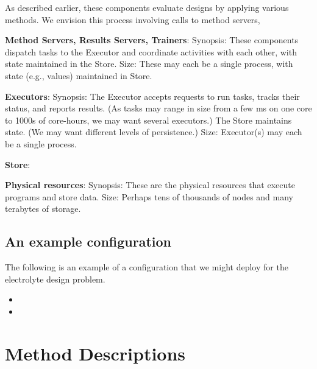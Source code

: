 \documentclass[10pt]{article}
\begin{document}
As described earlier, these components evaluate designs by applying various methods. 
We envision this process involving calls to method servers, 



\textbf{Method Servers, Results Servers, Trainers}: 
Synopsis: These components dispatch tasks to the Executor and coordinate activities with each other, with state maintained in the Store.
Size: These may each be a single process, with state (e.g., values) maintained in Store.


\textbf{Executors}:
Synopsis: The Executor accepts requests to run tasks, tracks their status, and reports results. (As tasks may range in size from a few ms on one core to 1000s of core-hours, we may want several executors.) The Store maintains state. (We may want different levels of persistence.)
Size: Executor(s) may each be a single process.

\textbf{Store}: 

\textbf{Physical resources}: 
Synopsis: These are the physical resources that execute programs and store data.
Size: Perhaps tens of thousands of nodes and many terabytes of storage.

\subsection{An example configuration}

The following is an example of a configuration that we might deploy for the electrolyte design problem.

\begin{itemize}
\item


\item

\end{itemize}


\section{Method Descriptions}\label{sec:details}
\end{document}
